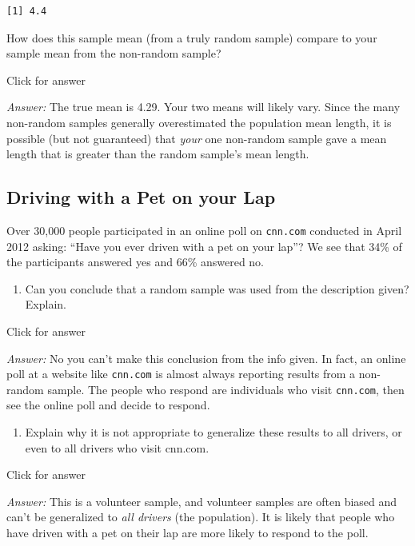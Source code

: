 \documentclass[
]{book}
\providecommand{\tightlist}{%
  \setlength{\itemsep}{0pt}\setlength{\parskip}{0pt}}
\begin{document}
\begin{verbatim}
[1] 4.4
\end{verbatim}

How does this sample mean (from a truly random sample) compare to your sample mean from the non-random sample?

Click for answer

\emph{Answer:} The true mean is 4.29. Your two means will likely vary. Since the many non-random samples generally overestimated the population mean length, it is possible (but not guaranteed) that \emph{your} one non-random sample gave a mean length that is greater than the random sample's mean length.

\hypertarget{driving-with-a-pet-on-your-lap}{%
\subsection{Driving with a Pet on your Lap}\label{driving-with-a-pet-on-your-lap}}

Over 30,000 people participated in an online poll on \texttt{cnn.com} conducted in April 2012 asking: ``Have you ever driven with a pet on your lap''? We see that 34\% of the participants answered yes and 66\% answered no.

\begin{enumerate}
\def\labelenumi{\alph{enumi}.}
\tightlist
\item
  Can you conclude that a random sample was used from the description given? Explain.
\end{enumerate}

Click for answer

\emph{Answer:} No you can't make this conclusion from the info given. In fact, an online poll at a website like \texttt{cnn.com} is almost always reporting results from a non-random sample. The people who respond are individuals who visit \texttt{cnn.com}, then see the online poll and decide to respond.

\begin{enumerate}
\def\labelenumi{\alph{enumi}.}
\setcounter{enumi}{1}
\tightlist
\item
  Explain why it is not appropriate to generalize these results to all drivers, or even to all drivers who visit cnn.com.
\end{enumerate}

Click for answer

\emph{Answer:} This is a volunteer sample, and volunteer samples are often biased and can't be generalized to \emph{all drivers} (the population). It is likely that people who have driven with a pet on their lap are more likely to respond to the poll.
\end{document}
